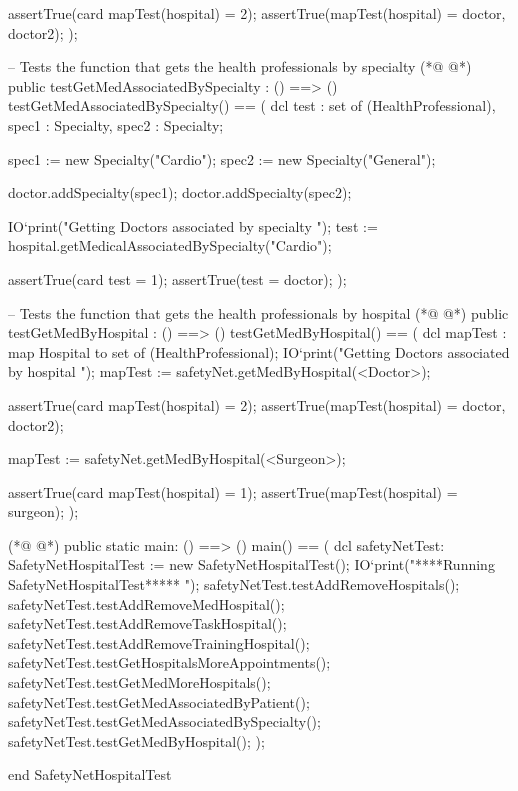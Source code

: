 \begin{vdmpp}[breaklines=true]
    assertTrue(card mapTest(hospital) = 2);
    assertTrue(mapTest(hospital) = {doctor, doctor2});
   );
   
   -- Tests the function that gets the health professionals by specialty
(*@
\label{testGetMedAssociatedBySpecialty:293}
@*)
   public testGetMedAssociatedBySpecialty : () ==> ()
   testGetMedAssociatedBySpecialty() == (    
    dcl test : set of (HealthProfessional), spec1 : Specialty, spec2 : Specialty;
    
    spec1 := new Specialty("Cardio");
    spec2 := new Specialty("General");
    
    doctor.addSpecialty(spec1);
    doctor.addSpecialty(spec2);
    
    IO`print("\n\n Getting Doctors associated by specialty \n");
    test := hospital.getMedicalAssociatedBySpecialty("Cardio");
    
    assertTrue(card test = 1);
    assertTrue(test = {doctor});
   );
  
  -- Tests the function that gets the health professionals by hospital
(*@
\label{testGetMedByHospital:311}
@*)
  public testGetMedByHospital : () ==> ()
   testGetMedByHospital() == (
    dcl mapTest : map Hospital to set of (HealthProfessional);
    IO`print("\n\n Getting Doctors associated by hospital \n");
    mapTest := safetyNet.getMedByHospital(<Doctor>);
    
    assertTrue(card mapTest(hospital) = 2);
    assertTrue(mapTest(hospital) = {doctor, doctor2});
    
    mapTest := safetyNet.getMedByHospital(<Surgeon>);
    
    assertTrue(card mapTest(hospital) = 1);
    assertTrue(mapTest(hospital) = {surgeon});
   );
   
(*@
\label{main:326}
@*)
  public static main: () ==> ()
   main() == (
    dcl safetyNetTest: SafetyNetHospitalTest := new SafetyNetHospitalTest();
    IO`print("\n *****Running SafetyNetHospitalTest***** \n");
    safetyNetTest.testAddRemoveHospitals();
    safetyNetTest.testAddRemoveMedHospital();
    safetyNetTest.testAddRemoveTaskHospital();
    safetyNetTest.testAddRemoveTrainingHospital();
    safetyNetTest.testGetHospitalsMoreAppointments();
    safetyNetTest.testGetMedMoreHospitals();
    safetyNetTest.testGetMedAssociatedByPatient();
    safetyNetTest.testGetMedAssociatedBySpecialty();
    safetyNetTest.testGetMedByHospital();
   );
      
end SafetyNetHospitalTest
\end{vdmpp}
\bigskip
